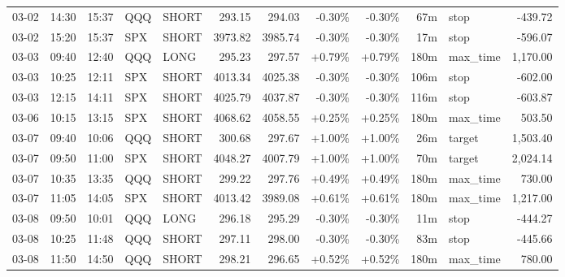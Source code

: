 \documentclass[11pt,a4paper,twoside]{article}
\begin{document}
\begin{center}
\begin{longtable}{>{\color{txtmain}}l l l l l r r r r r >{\color{txtmain}}l r}
03-02 & 14:30 & 15:37 & QQQ & SHORT & 293.15 & 294.03 & \textcolor{lossred}{-0.30\%} & \textcolor{lossred}{-0.30\%} & 67m & stop & \textcolor{lossred}{-439.72} \\
03-02 & 15:20 & 15:37 & SPX & SHORT & 3973.82 & 3985.74 & \textcolor{lossred}{-0.30\%} & \textcolor{lossred}{-0.30\%} & 17m & stop & \textcolor{lossred}{-596.07} \\
03-03 & 09:40 & 12:40 & QQQ & LONG & 295.23 & 297.57 & \textcolor{wingreen}{+0.79\%} & \textcolor{wingreen}{+0.79\%} & 180m & max\_time & \textcolor{wingreen}{1,170.00} \\
03-03 & 10:25 & 12:11 & SPX & SHORT & 4013.34 & 4025.38 & \textcolor{lossred}{-0.30\%} & \textcolor{lossred}{-0.30\%} & 106m & stop & \textcolor{lossred}{-602.00} \\
03-03 & 12:15 & 14:11 & SPX & SHORT & 4025.79 & 4037.87 & \textcolor{lossred}{-0.30\%} & \textcolor{lossred}{-0.30\%} & 116m & stop & \textcolor{lossred}{-603.87} \\
03-06 & 10:15 & 13:15 & SPX & SHORT & 4068.62 & 4058.55 & \textcolor{wingreen}{+0.25\%} & \textcolor{wingreen}{+0.25\%} & 180m & max\_time & \textcolor{wingreen}{503.50} \\
03-07 & 09:40 & 10:06 & QQQ & SHORT & 300.68 & 297.67 & \textcolor{wingreen}{+1.00\%} & \textcolor{wingreen}{+1.00\%} & 26m & target & \textcolor{wingreen}{1,503.40} \\
03-07 & 09:50 & 11:00 & SPX & SHORT & 4048.27 & 4007.79 & \textcolor{wingreen}{+1.00\%} & \textcolor{wingreen}{+1.00\%} & 70m & target & \textcolor{wingreen}{2,024.14} \\
03-07 & 10:35 & 13:35 & QQQ & SHORT & 299.22 & 297.76 & \textcolor{wingreen}{+0.49\%} & \textcolor{wingreen}{+0.49\%} & 180m & max\_time & \textcolor{wingreen}{730.00} \\
03-07 & 11:05 & 14:05 & SPX & SHORT & 4013.42 & 3989.08 & \textcolor{wingreen}{+0.61\%} & \textcolor{wingreen}{+0.61\%} & 180m & max\_time & \textcolor{wingreen}{1,217.00} \\
03-08 & 09:50 & 10:01 & QQQ & LONG & 296.18 & 295.29 & \textcolor{lossred}{-0.30\%} & \textcolor{lossred}{-0.30\%} & 11m & stop & \textcolor{lossred}{-444.27} \\
03-08 & 10:25 & 11:48 & QQQ & SHORT & 297.11 & 298.00 & \textcolor{lossred}{-0.30\%} & \textcolor{lossred}{-0.30\%} & 83m & stop & \textcolor{lossred}{-445.66} \\
03-08 & 11:50 & 14:50 & QQQ & SHORT & 298.21 & 296.65 & \textcolor{wingreen}{+0.52\%} & \textcolor{wingreen}{+0.52\%} & 180m & max\_time & \textcolor{wingreen}{780.00} \\

\end{longtable}
\end{center}
\end{document}
